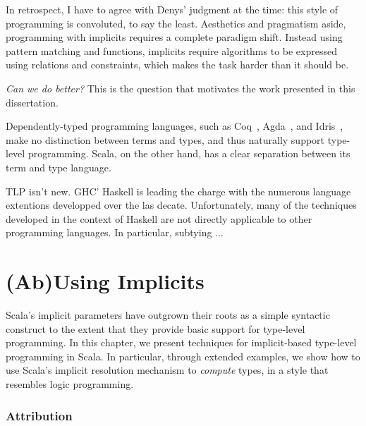 In retrospect, I have to agree with Denys' judgment at the time: this style of programming is convoluted, to say the least.
Aesthetics and pragmatism aside, programming with implicits requires a complete paradigm shift.
Instead using pattern matching and functions, implicits require algorithms to be expressed using relations and constraints, which makes the task harder than it should be.

\emph{Can we do better?} This is the question that motivates the work presented in this dissertation.

Dependently-typed programming languages, such as Coq~\citep{bertot2004interactive}, Agda~\citep{norell2007towards}, and Idris~\citep{brady2014idris}, make no distinction between terms and types, and thus naturally support type-level programming.
Scala, on the other hand, has a clear separation between its term and type language.


TLP isn't new. GHC' Haskell is leading the charge with the numerous language extentions developped over the las decate. Unfortunately, many of the techniques developed in the context of Haskell are not directly applicable to other programming languages. In particular, subtying ...


\lipsum[1]

\chapter{(Ab)Using Implicits}
\label{chap:ab-using-implicits}

Scala's implicit parameters have outgrown their roots as a simple syntactic construct to the extent that they provide basic support for type-level programming.
In this chapter, we present techniques for implicit-based type-level programming in Scala.
In particular, through extended examples, we show how to use Scala's implicit resolution mechanism to \emph{compute} types, in a style that resembles logic programming.

\subsection*{Attribution}

